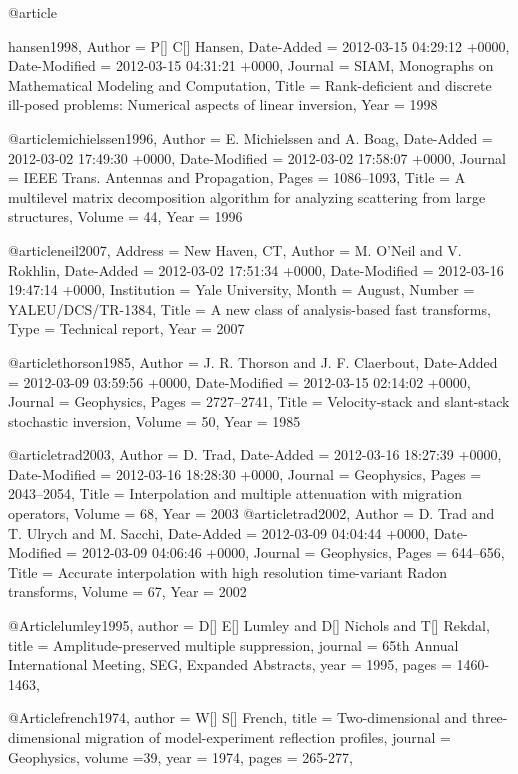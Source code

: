 @article{hansen1998,
	Author = {P[] C[] Hansen,
	Date-Added = {2012-03-15 04:29:12 +0000},
	Date-Modified = {2012-03-15 04:31:21 +0000},
	Journal = {SIAM, Monographs on Mathematical Modeling and Computation},
	Title = {Rank-deficient and discrete ill-posed problems: Numerical aspects of linear inversion},
	Year = {1998}}

@article{michielssen1996,
	Author = {E. Michielssen and A. Boag},
	Date-Added = {2012-03-02 17:49:30 +0000},
	Date-Modified = {2012-03-02 17:58:07 +0000},
	Journal = {IEEE Trans. Antennas and Propagation},
	Pages = {1086--1093},
	Title = {A multilevel matrix decomposition algorithm for analyzing scattering from large structures},
	Volume = {44},
	Year = {1996}}

@article{neil2007,
	Address = {New Haven, CT},
	Author = {M. O'Neil and V. Rokhlin},
	Date-Added = {2012-03-02 17:51:34 +0000},
	Date-Modified = {2012-03-16 19:47:14 +0000},
	Institution = {Yale University},
	Month = {August},
	Number = {YALEU/DCS/TR-1384},
	Title = {A new class of analysis-based fast transforms},
	Type = {Technical report},
	Year = {2007}}

@article{thorson1985,
	Author = {J. R. Thorson and J. F. Claerbout},
	Date-Added = {2012-03-09 03:59:56 +0000},
	Date-Modified = {2012-03-15 02:14:02 +0000},
	Journal = {Geophysics},
	Pages = {2727--2741},
	Title = {Velocity-stack and slant-stack stochastic inversion},
	Volume = {50},
	Year = {1985}}

@article{trad2003,
	Author = {D. Trad},
	Date-Added = {2012-03-16 18:27:39 +0000},
	Date-Modified = {2012-03-16 18:28:30 +0000},
	Journal = {Geophysics},
	Pages = {2043--2054},
	Title = {Interpolation and multiple attenuation with migration operators},
	Volume = {68},
	Year = {2003}}
@article{trad2002,
	Author = {D. Trad and T. Ulrych and M. Sacchi},
	Date-Added = {2012-03-09 04:04:44 +0000},
	Date-Modified = {2012-03-09 04:06:46 +0000},
	Journal = {Geophysics},
	Pages = {644--656},
	Title = {Accurate interpolation with high resolution time-variant {R}adon transforms},
	Volume = {67},
	Year = {2002}}

@Article{lumley1995,
  author = 	 {D[] E[] Lumley and D[] Nichols and T[] Rekdal},
  title = 	 {Amplitude-preserved multiple suppression},
  journal = 	 {65th Annual International Meeting, SEG, Expanded Abstracts},
  year = 	 1995,
  pages =	 {1460-1463},
}

@Article{french1974,
  author = 	 {W[] S[] French},
  title = 	 {Two-dimensional and three-dimensional migration of model-experiment reflection profiles},
  journal = 	 {Geophysics},
  volume ={39},
  year = 	 1974,
  pages =	 {265-277},
}

}
